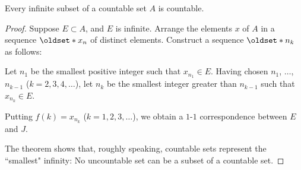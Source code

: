 \begin{theorem}\label{theorem:2.1}
    Every infinite subset of a countable set \(A\) is countable.
\end{theorem}

\begin{proof}
    Suppose \(E\subset A\), and \(E\) is infinite. Arrange the elements \(x\) of \(A\) in a sequence \(\set{x_n}\) of distinct elements. Construct a sequence \(\set{n_k}\) as follows:
    
    Let \(n_1\) be the smallest positive integer such that \(x_{n_1}\in E\). Having chosen \(n_1\), \(\ldots\), \(n_{k-1}\) (\(k=2,3,4,\ldots\)), let \(n_k\) be the smallest integer greater than \(n_{k-1}\) such that \(x_{n_k}\in E\).
    
    Putting \(f\left(k\right)=x_{n_k}\) (\(k=1,2,3,\ldots\)), we obtain a \(1\)-\(1\) correspondence between \(E\) and \(J\).
    
    The theorem shows that, roughly speaking, countable sets represent the ``smallest" infinity: No uncountable set can be a subset of a countable set.
\end{proof}

